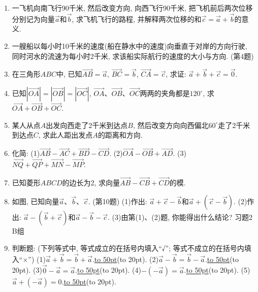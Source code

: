 \documentclass[10pt,a4paper]{article}
\newcommand{\blank}[1]{\underline{\hbox to #1pt{}}}
\newcommand{\bracket}[1]{(\hbox to #1pt{})}
\begin{document}
\begin{enumerate}[1.]
\item 一飞机向南飞行90千米, 然后改变方向, 向西飞行90千米, 把飞机前后两次位移分别记为向量$\overrightarrow a$和$\overrightarrow b$, 求飞机飞行的路程, 并解释两次位移的和$\overrightarrow c=\overrightarrow a+\overrightarrow b$的意义.
\item 一艘船以每小时10千米的速度(船在静水中的速度)向垂直于对岸的方向行驶, 同时河水的流速为每小时2千米, 求该船实际航行的速度的大小与方向.
(第4题)
\item 在三角形$ABC$中, 已知$\overrightarrow {AB}=\overrightarrow a$, $\overrightarrow {BC}=\overrightarrow b$, $\overrightarrow {CA}=\overrightarrow c$, 求证: $\overrightarrow a+\overrightarrow b+\overrightarrow c=\overrightarrow 0$.
\item 已知$|\overrightarrow {OA}|=|\overrightarrow {OB}|=|\overrightarrow {OC}|$, $\overrightarrow {OA}$、$\overrightarrow {OB}$、$\overrightarrow {OC}$两两的夹角都是$120^{\circ }$, 求$\overrightarrow {OA}+\overrightarrow {OB}+\overrightarrow {OC}$.
\item 某人从点$A$出发向西走了2千米到达点$B$, 然后改变方向向西偏北$60^{\circ }$走了2千米到达点$C$, 求此人距出发点$A$的距离和方向.
\item 化简:
(1)$\overrightarrow {AB}-\overrightarrow {AC}+\overrightarrow {BD}-\overrightarrow {CD}$.				(2)$\overrightarrow {OA}-\overrightarrow {OB}+\overrightarrow {AD}$.
(3)$\overrightarrow {NQ}+\overrightarrow {QP}+\overrightarrow {MN}-\overrightarrow {MP}$.
\item 已知菱形$ABCD$的边长为2, 求向量$\overrightarrow {AB}-\overrightarrow {CB}+\overrightarrow {CD}$的模.
\item 如图, 已知向量$\overrightarrow a$、$\overrightarrow b$、$\overrightarrow c$.
(第10题)
(1)作出: $\overrightarrow a+\overrightarrow c-\overrightarrow b$和$\overrightarrow a+(\overrightarrow c-\overrightarrow b)$.			(2)作出: $\overrightarrow a-(\overrightarrow b+\overrightarrow c)$和$\overrightarrow a-\overrightarrow b-\overrightarrow c$.
(3)由第(1)、(2)题, 你能得出什么结论?
习题2  B组
\item 判断题: (下列等式中, 等式成立的在括号内填入``√''; 等式不成立的在括号内填入``×'')
(1)$\overrightarrow a+\overrightarrow b=\overrightarrow b+\overrightarrow a$.\blank{50}\bracket{20}.
(2)$\overrightarrow a-\overrightarrow b=\overrightarrow b-\overrightarrow a$.\blank{50}\bracket{20}.
(3)$\overrightarrow 0-\overrightarrow a=\overrightarrow a$.\blank{50}\bracket{20}.
(4)$-(-\overrightarrow a)=\overrightarrow a$.\blank{50}\bracket{20}.
(5)$\overrightarrow a+(-\overrightarrow a)=0$.\blank{50}\bracket{20}.

\end{enumerate}
\end{document}
